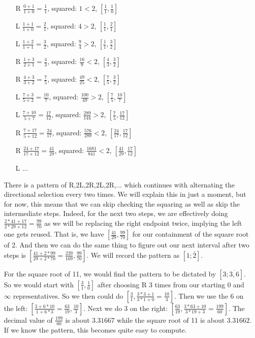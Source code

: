 \documentclass[12pt]{article}
\theoremstyle{remark}
\begin{document}
\begin{itemize}
    \item[R] $\tfrac{0+1}{1+0} = \tfrac{1}{1}$, squared: $1 < 2$,  $[\tfrac{1}{1},\tfrac{1}{0}] $
    \item[L] $\tfrac{1+1}{1+0} = \tfrac{2}{1}$, squared: $4 > 2$, $[\tfrac{1}{1},\tfrac{2}{1}]$
    \item[L] $\tfrac{1+2}{1+1} = \tfrac{3}{2}$, squared: $\tfrac{9}{4} > 2$, $[\tfrac{1}{1},\tfrac{3}{2}]$
    \item[R] $\tfrac{1+3}{2+1} = \tfrac{4}{3}$, squared: $\tfrac{16}{9} < 2$, $[\tfrac{4}{3},\tfrac{3}{2}]$
    \item[R] $\tfrac{4+3}{3+2} = \tfrac{7}{5}$, squared: $\tfrac{49}{25} < 2$, 
    $[\tfrac{7}{5},\tfrac{3}{2}]$
    \item[L] $\tfrac{7+3}{5+2} = \tfrac{10}{7}$, squared: $\tfrac{100}{49} > 2$, 
    $[\tfrac{7}{5},\tfrac{10}{7}]$
    \item[L] $\tfrac{7+10}{5+7} = \tfrac{17}{12}$, squared: $\tfrac{289}{144} > 2$, 
    $[\tfrac{7}{5},\tfrac{17}{12}]$
    \item[R] $\tfrac{7+17}{5+12} = \tfrac{24}{17}$, squared: $\tfrac{576}{289} < 2$, 
    $[\tfrac{24}{17},\tfrac{17}{12}]$
    \item[R] $\tfrac{24+17}{17+12} = \tfrac{41}{29}$, squared: $\tfrac{1681}{841} < 2$, 
    $[\tfrac{41}{29},\tfrac{17}{12}]$
    \item[L] $\ldots$
\end{itemize}

There is a pattern of R,2L,2R,2L,2R,$\ldots$ which continues with alternating the directional selection every two times. We will explain this in just a moment, but for now, this means that we can skip checking the squaring as well as skip the intermediate steps. Indeed, for the next two steps, we are effectively doing $\tfrac{2*41 + 17}{2*29 + 12} = \tfrac{99}{70}$ as we will be replacing the right endpoint twice, implying the left one gets reused. That is, we have $[\tfrac{41}{29}, \tfrac{99}{70}]$ for our containment of the square root of 2. And then we can do the same thing to figure out our next interval after two steps is $[\tfrac{41+2*99}{29+2*70}=\tfrac{239}{169}, \tfrac{99}{70}]$. We will record the pattern as $[1; \bar{2}]$.

For the square root of 11, we would find the pattern to be dictated by $[3;\overline{3,6}]$. So we would start with $[\tfrac{3}{1}, \tfrac{1}{0}]$ after choosing R 3 times from our starting 0 and $\infty$ representatives. So we then could do $[\tfrac{3}{1}, \tfrac{3*3 + 1}{3*1 + 0} = \tfrac{10}{3}]$. Then we use the 6 on the left:  $[\tfrac{3+6*10}{1+6*3} = \tfrac{63}{19}, \tfrac{10}{3}]$. Next we do 3 on the right:  $[\tfrac{63}{19}, \tfrac{3*63+10}{3*19+3} = \tfrac{199}{60}]$. The decimal value of $\tfrac{199}{60}$ is about $3.31667$ while the square root of 11 is about $3.31662$. If we know the pattern, this becomes quite easy to compute. 
\end{document}
